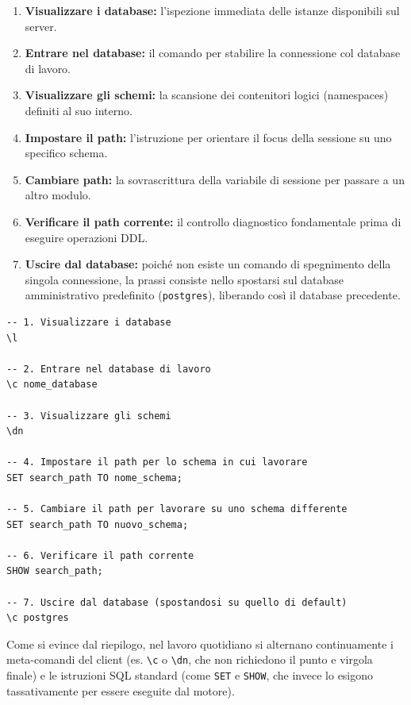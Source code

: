 \begin{enumerate}
    \item \textbf{Visualizzare i database:} l'ispezione immediata delle istanze disponibili sul server.
    \item \textbf{Entrare nel database:} il comando per stabilire la connessione col database di lavoro.
    \item \textbf{Visualizzare gli schemi:} la scansione dei contenitori logici (namespaces) definiti al suo interno.
    \item \textbf{Impostare il path:} l'istruzione per orientare il focus della sessione su uno specifico schema.
    \item \textbf{Cambiare path:} la sovrascrittura della variabile di sessione per passare a un altro modulo.
    \item \textbf{Verificare il path corrente:} il controllo diagnostico fondamentale prima di eseguire operazioni DDL.
    \item \textbf{Uscire dal database:} poiché non esiste un comando di spegnimento della singola connessione, la prassi consiste nello spostarsi sul database amministrativo predefinito (\texttt{postgres}), liberando così il database precedente.
\end{enumerate}

\begin{lstlisting}[language=PostgreSQL, title=Cheat Sheet: Navigazione di Base]
-- 1. Visualizzare i database
\l

-- 2. Entrare nel database di lavoro
\c nome_database

-- 3. Visualizzare gli schemi
\dn

-- 4. Impostare il path per lo schema in cui lavorare
SET search_path TO nome_schema;

-- 5. Cambiare il path per lavorare su uno schema differente
SET search_path TO nuovo_schema;

-- 6. Verificare il path corrente
SHOW search_path;

-- 7. Uscire dal database (spostandosi su quello di default)
\c postgres
\end{lstlisting}

\begin{warningbox}
Come si evince dal riepilogo, nel lavoro quotidiano si alternano continuamente i meta-comandi del client (es. \texttt{\textbackslash c} o \texttt{\textbackslash dn}, che non richiedono il punto e virgola finale) e le istruzioni SQL standard (come \texttt{SET} e \texttt{SHOW}, che invece lo esigono tassativamente per essere eseguite dal motore).
\end{warningbox}

